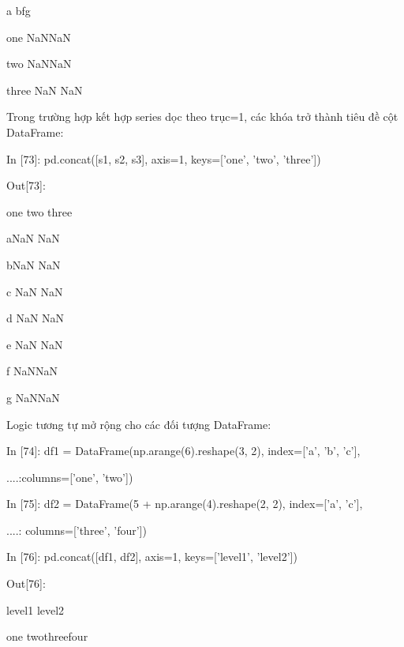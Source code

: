 \par\quad\textup \quad\quad\quad\quad\quad\quad a \quad\quad\quad \quad b\quad\quad\quad  \quad\quad f\quad\quad\quad\quad\quad g
\par\quad\textup one \quad\quad\quad{}\quad\quad\quad{}\quad\quad\quad\quad  NaN\quad\quad\quad\quad  NaN
\par\quad\textup two \quad\quad\quad{} \quad\quad\quad{}\quad\quad\quad\quad  NaN\quad\quad  NaN
\par\quad\textup  three \quad\quad\quad NaN \quad\quad NaN\quad\quad\quad{}\quad\quad\quad{}
\par Trong trường hợp kết hợp series dọc theo trục=1, các khóa trở thành tiêu đề cột DataFrame:
\par\quad\textup In [73]: pd.concat([s1, s2, s3], axis=1, keys=['one', 'two', 'three'])
\par\quad\textup Out[73]:
\par\quad\textup\quad   one\xspace two\xspace three
\par\quad\textup a\quad NaN\xspace\xspace\xspace NaN
\par\quad\textup b\quad NaN\xspace\xspace\xspace NaN
\par\quad\textup c NaN\quad{}\xspace\xspace\xspace NaN
\par\quad\textup d NaN\quad{}\xspace\xspace\xspace NaN
\par\quad\textup e NaN\quad{}\xspace\xspace\xspace NaN
\par\quad\textup f NaN\quad NaN\quad{}
\par\quad\textup g NaN\quad NaN\quad{}
\par\quad\textup Logic tương tự mở rộng cho các đối tượng DataFrame:
\par\quad\textup In [74]: df1 = DataFrame(np.arange(6).reshape(3, 2), index=['a', 'b', 'c'],
\par\quad\textup  ....:\quad\quad\quad\quad  columns=['one', 'two'])
\par\quad\textup In [75]: df2 = DataFrame(5 + np.arange(4).reshape(2, 2), index=['a', 'c'],
\par\quad\textup ....: \quad\quad\quad\quad columns=['three', 'four'])
\par\quad\textup In [76]: pd.concat([df1, df2], axis=1, keys=['level1', 'level2'])
\par\quad\textup Out[76]:
\par\quad\textup\quad \quad\quad  level1 \quad\quad level2
\par\quad\textup \quad\quad\quad\quad  one \quad\quad\quad two\quad\quad\quad  three\quad\quad\quad four
